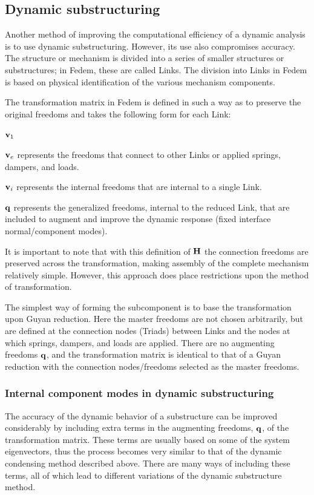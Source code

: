 \subsection{Dynamic substructuring}

Another method of improving the computational efficiency of a dynamic analysis is to use dynamic
substructuring. However, its use also compromises accuracy. The structure or mechanism is divided
into a series of smaller structures or substructures; in Fedem, these are called Links. The
division into Links in Fedem is based on physical identification of the various mechanism components.

The transformation matrix in Fedem is defined in such a way as to preserve the original freedoms
and takes the following form for each Link:
%
\begin{namelist}{${\bf v}_1$\ }
\item[{${\bf v}_e$}] represents the freedoms that connect to other Links or applied springs,
dampers, and loads.
%
\item[{${\bf v}_i$}] represents the internal freedoms that are internal to a single Link.
%
\item[{$\bf q$}] represents the generalized freedoms, internal to the reduced Link, that are
included to augment and improve the dynamic response (fixed interface normal/component modes).
\end{namelist}
%
It is important to note that with this definition of $\bf H$ the connection freedoms are preserved
across the transformation, making assembly of the complete mechanism relatively simple. However,
this approach does place restrictions upon the method of transformation.

The simplest way of forming the subcomponent is to base the transformation upon Guyan reduction.
Here the master freedoms are not chosen arbitrarily, but are defined at the connection nodes
(Triads) between Links and the nodes at which springs, dampers, and loads are applied. There
are no augmenting freedoms $\bf q$, and the transformation matrix is identical to that of a
Guyan reduction with the connection nodes/freedoms selected as the master freedoms.

\subsubsection{Internal component modes in dynamic substructuring}

The accuracy of the dynamic behavior of a substructure can be improved considerably by including
extra terms in the augmenting freedoms, $\bf q$, of the transformation matrix. These terms
are usually based on some of the system eigenvectors, thus the process becomes very similar
to that of the dynamic condensing method described above. There are many ways of including
these terms, all of which lead to different variations of the dynamic substructure method.

